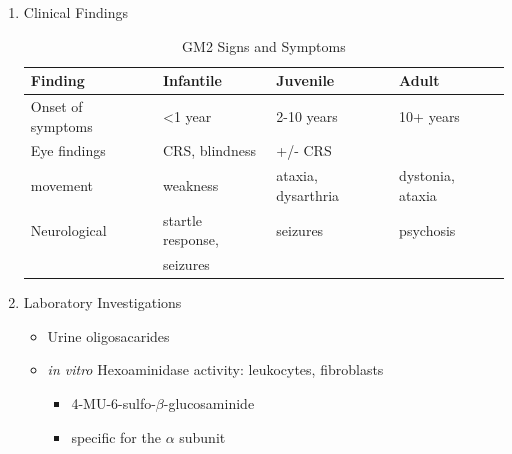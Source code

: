 \documentclass{scrartcl}
\begin{document}
\begin{enumerate}
\item Clinical Findings
\label{sec:orgd58bd19}
\begin{table}[htbp]
\caption{\label{tab:orgc82efc1}
GM2 Signs and Symptoms}
\centering
\begin{tabular}{llll}
Finding & Infantile & Juvenile & Adult\\
\hline
Onset of symptoms & <1 year & 2-10 years & 10+ years\\
Eye findings & CRS, blindness & +/- CRS & \\
movement & weakness & ataxia, dysarthria & dystonia, ataxia\\
Neurological & startle response, & seizures & psychosis\\
 & seizures &  & \\
\end{tabular}
\end{table}


\item Laboratory Investigations
\label{sec:orgcff53d3}
\begin{itemize}
\item Urine oligosacarides
\item \emph{in vitro} Hexoaminidase activity: leukocytes, fibroblasts
\begin{itemize}
\item 4-MU-6-sulfo-\(\beta\)-glucosaminide
\item specific for the \(\alpha\) subunit
\end{itemize}


\end{itemize}
\end{enumerate}
\end{document}
